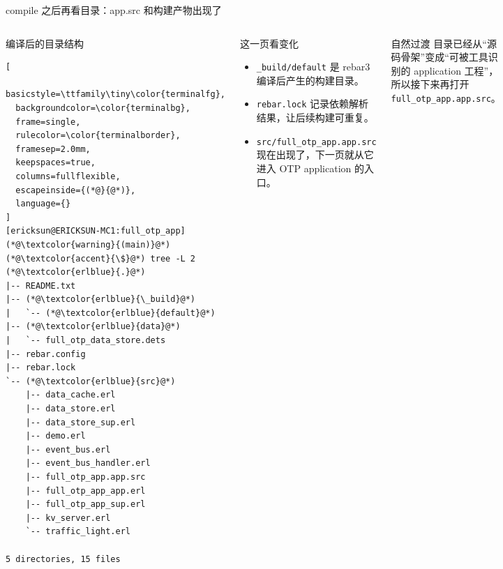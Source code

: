 \documentclass[aspectratio=169, 9pt]{beamer}
\newcommand{\code}[1]{\texttt{#1}}
\begin{document}
\begin{frame}[fragile]{compile 之后再看目录：app.src 和构建产物出现了}
  \begin{columns}[T,onlytextwidth]
    \begin{block}{编译后的目录结构}
\begin{lstlisting}[
  basicstyle=\ttfamily\tiny\color{terminalfg},
  backgroundcolor=\color{terminalbg},
  frame=single,
  rulecolor=\color{terminalborder},
  framesep=2.0mm,
  keepspaces=true,
  columns=fullflexible,
  escapeinside={(*@}{@*)},
  language={}
]
[ericksun@ERICKSUN-MC1:full_otp_app] (*@\textcolor{warning}{(main)}@*) (*@\textcolor{accent}{\$}@*) tree -L 2
(*@\textcolor{erlblue}{.}@*)
|-- README.txt
|-- (*@\textcolor{erlblue}{\_build}@*)
|   `-- (*@\textcolor{erlblue}{default}@*)
|-- (*@\textcolor{erlblue}{data}@*)
|   `-- full_otp_data_store.dets
|-- rebar.config
|-- rebar.lock
`-- (*@\textcolor{erlblue}{src}@*)
    |-- data_cache.erl
    |-- data_store.erl
    |-- data_store_sup.erl
    |-- demo.erl
    |-- event_bus.erl
    |-- event_bus_handler.erl
    |-- full_otp_app.app.src
    |-- full_otp_app_app.erl
    |-- full_otp_app_sup.erl
    |-- kv_server.erl
    `-- traffic_light.erl

5 directories, 15 files
\end{lstlisting}
    \end{block}
    \footnotesize
    \begin{block}{这一页看变化}
      \begin{itemize}
        \item \code{\_build/default} 是 rebar3 编译后产生的构建目录。
        \item \code{rebar.lock} 记录依赖解析结果，让后续构建可重复。
        \item \code{src/full\_otp\_app.app.src} 现在出现了，下一页就从它进入 OTP application 的入口。
      \end{itemize}
    \end{block}
    \vspace{0.15cm}
    \begin{exampleblock}{自然过渡}
      目录已经从“源码骨架”变成“可被工具识别的 application 工程”，所以接下来再打开 \code{full\_otp\_app.app.src}。
    \end{exampleblock}
  \end{columns}
\end{frame}
\end{document}
